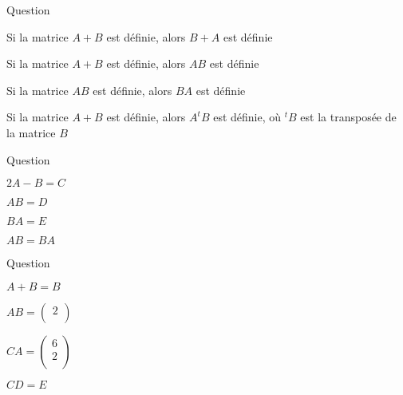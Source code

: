 

\begin{multi}[multiple,feedback=
{La somme de deux matrices est définie si les deux matrices admettent la même taille. Dans ce cas, on a \(A+B=B+A\). Le produit \(AB\) de deux matrices est défini si le nombre de colonnes de \(A\) est égal au nombre de lignes de \(B\). Le produit n'est pas commutatif.
}]{Question}
    \item* Si la matrice \(A+B\) est définie, alors \(B+A\) est définie
    \item Si la matrice \(A+B\) est définie, alors \(AB\) est définie
    \item Si la matrice \(AB\) est définie, alors \(BA\) est définie
    \item* Si la matrice \(A+B\) est définie, alors \(A^tB\) est définie, où \(^tB\) est la transposée de la matrice \(B\)
\end{multi}


\begin{multi}[multiple,feedback=
{On a : \(2A-B=C\), \(AB=D\) et \(BA =  \left(\begin{array}{rc}4&6\\-2&-2 \end{array}\right)\).
}]{Question}
    \item* \(2A-B=C\)
    \item* \(AB=D\)
    \item \(BA=E\)
    \item \(AB=BA\)
\end{multi}


\begin{multi}[multiple,feedback=
{Les opérations \(A+B\) et \(CA\) ne sont pas définies.
}]{Question}
    \item \(A+B=B\)
    \item* \(AB=\left(\begin{array}{rc}2\\ \end{array}\right)\)
    \item \(CA=\left(\begin{array}{rc}6\\ 2\\\end{array}\right)\)
    \item* \(CD=E\)
\end{multi}


